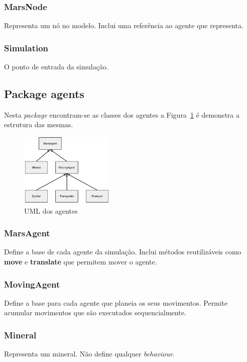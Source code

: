 \documentclass[12pt]{report}
\begin{document}
\subsubsection{MarsNode}
Representa um nó no modelo. Inclui uma referência ao agente que representa.
\subsubsection{Simulation}
O ponto de entrada da simulação.

\subsection{Package agents}
Nesta \emph{package} encontram-se as classes dos agentes a Figura~\ref{agents-uml} é demonstra a estrutura das mesmas.

\begin{figure}[h]
	\centering
	\includegraphics[width=0.4\textwidth]{agents-uml}
	\caption{UML dos agentes}
	\label{agents-uml}
\end{figure}

\FloatBarrier
\subsubsection{MarsAgent}
Define a base de cada agente da simulação. Inclui métodos reutilizáveis como \textbf{move} e \textbf{translate} que permitem mover o agente.
\subsubsection{MovingAgent}
Define a base para cada agente que planeia os seus movimentos. Permite acumular movimentos que são executados sequencialmente.
\subsubsection{Mineral}
Representa um mineral. Não define qualquer \emph{behaviour}.
\end{document}

